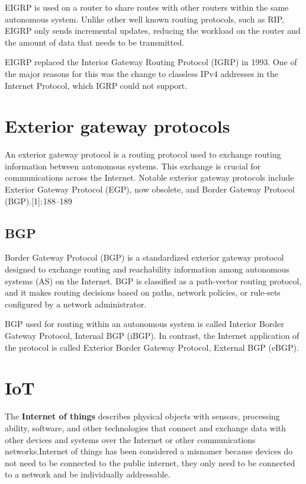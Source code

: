 \documentclass[a4paper,12pt]{article}
\begin{document}
EIGRP is used on a router to share routes with other routers within the same autonomous system. Unlike other well known routing protocols, such as RIP, EIGRP only sends incremental updates, reducing the workload on the router and the amount of data that needs to be transmitted.

EIGRP replaced the Interior Gateway Routing Protocol (IGRP) in 1993. One of the major reasons for this was the change to classless IPv4 addresses in the Internet Protocol, which IGRP could not support.

\section{Exterior gateway protocols}

An exterior gateway protocol is a routing protocol used to exchange routing information between autonomous systems. This exchange is crucial for communications across the Internet. Notable exterior gateway protocols include Exterior Gateway Protocol (EGP), now obsolete, and Border Gateway Protocol (BGP).[1]: 188–189 

\subsection{BGP}
Border Gateway Protocol (BGP) is a standardized exterior gateway protocol designed to exchange routing and reachability information among autonomous systems (AS) on the Internet. BGP is classified as a path-vector routing protocol, and it makes routing decisions based on paths, network policies, or rule-sets configured by a network administrator.

BGP used for routing within an autonomous system is called Interior Border Gateway Protocol, Internal BGP (iBGP). In contrast, the Internet application of the protocol is called Exterior Border Gateway Protocol, External BGP (eBGP).

\section{IoT}
The \textbf{Internet of things} describes physical objects with sensors, processing ability, software, and other technologies that connect and exchange data with other devices and systems over the Internet or other communications networks.Internet of things has been considered a misnomer because devices do not need to be connected to the public internet, they only need to be connected to a network and be individually addressable.
\end{document}
